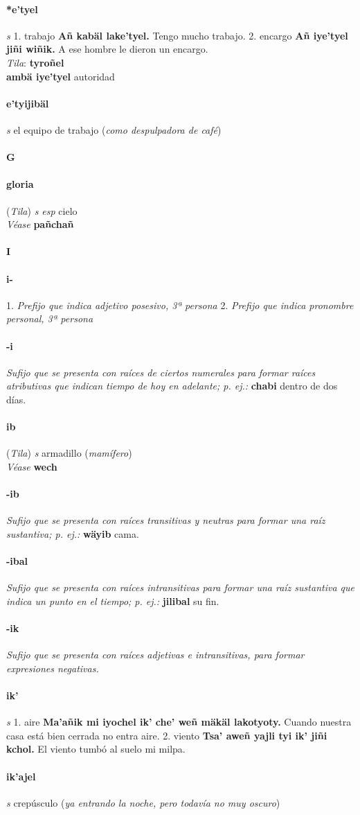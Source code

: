 \documentclass{scrbook}
\newcommand{\entry}[1]{\paragraph{#1}}
\newcommand{\alphaletter}[1]{\addsec{#1}}
\newcommand{\onedefinition}[1]{#1.}
\newcommand{\nontranslationdef}[1]{\textit{#1}}
\newcommand{\partofspeech}[1]{\textit{#1}}
\newcommand{\spanishtranslation}[1]{#1}
\newcommand{\clarification}[1]{(\textit{#1})}
\newcommand{\cholexample}[1]{\textbf{#1}}
\newcommand{\exampletranslation}[1]{#1}
\newcommand{\dialectvariant}[1]{\\\textit{#1}:}
\newcommand{\dialectword}[1]{\textbf{#1}}
\newcommand{\alsosee}[1]{\\\textit{Véase} \textbf{#1}}
\newcommand{\relevantdialect}[1]{(\textit{#1})}
\newcommand{\secondaryentry}[1]{\\\textbf{#1}}
\newcommand{\secondtranslation}[1]{#1}
\begin{document}
\begin{multicols}{2}
\entry{*e'tyel}
\partofspeech{s}
\onedefinition{1}
\spanishtranslation{trabajo}
\cholexample{Añ kabäl lake'tyel.}
\exampletranslation{Tengo mucho trabajo.}
\onedefinition{2}
\spanishtranslation{encargo}
\cholexample{Añ iye'tyel jiñi wiñik.}
\exampletranslation{A ese hombre le dieron un encargo.}
\dialectvariant{Tila}
\dialectword{tyroñel}
\secondaryentry{ambä iye'tyel}
\secondtranslation{autoridad}

\entry{e'tyijibäl}
\partofspeech{s}
\spanishtranslation{el equipo de trabajo}
\clarification{como despulpadora de café}

\entry{G}
\alphaletter{G}

\entry{gloria}
\relevantdialect{Tila}
\partofspeech{s esp}
\spanishtranslation{cielo}
\alsosee{pañchañ}

\entry{I}
\alphaletter{I}

\entry{i-}
\onedefinition{1}
\nontranslationdef{Prefijo que indica adjetivo posesivo, 3ª persona}
\onedefinition{2}
\nontranslationdef{Prefijo que indica pronombre personal, 3ª persona}

\entry{-i}
\nontranslationdef{Sufijo que se presenta con raíces de ciertos numerales para formar raíces atributivas que indican tiempo de hoy en adelante; p. ej.:}
\cholexample{chabi}
\exampletranslation{dentro de dos días.}

\entry{ib}
\relevantdialect{Tila}
\partofspeech{s}
\spanishtranslation{armadillo}
\clarification{mamífero}
\alsosee{wech}

\entry{-ib}
\nontranslationdef{Sufijo que se presenta con raíces transitivas y neutras para formar una raíz sustantiva; p. ej.:}
\cholexample{wäyib}
\exampletranslation{cama.}

\entry{-ibal}
\nontranslationdef{Sufijo que se presenta con raíces intransitivas para formar una raíz sustantiva que indica un punto en el tiempo; p. ej.:}
\cholexample{jilibal}
\exampletranslation{su fin.}

\entry{-ik}
\nontranslationdef{Sufijo que se presenta con raíces adjetivas e intransitivas, para formar expresiones negativas.}

\entry{ik'}
\partofspeech{s}
\onedefinition{1}
\spanishtranslation{aire}
\cholexample{Ma'añik mi iyochel ik' che' weñ mäkäl lakotyoty.}
\exampletranslation{Cuando nuestra casa está bien cerrada no entra aire.}
\onedefinition{2}
\spanishtranslation{viento}
\cholexample{Tsa' aweñ yajli tyi ik' jiñi kchol.}
\exampletranslation{El viento tumbó al suelo mi milpa.}

\entry{ik'ajel}
\partofspeech{s}
\spanishtranslation{crepúsculo}
\clarification{ya entrando la noche, pero todavía no muy oscuro}


\end{multicols}
\end{document}
